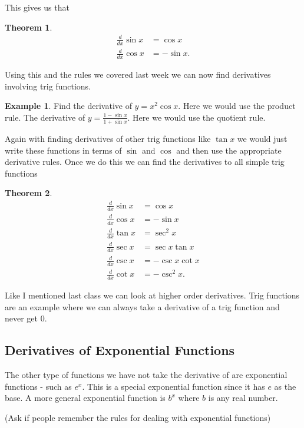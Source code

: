 \documentclass[12pt,reqno]{article}
\newtheorem{Theorem}{Theorem}
\theoremstyle{definition}
\newtheorem*{Example}{Example}
\begin{document}
This gives us that 
\begin{Theorem}
	\begin{align*}
		\frac{d}{dx} \sin x &= \cos x \\
		\frac{d}{dx} \cos x &= - \sin x.
	\end{align*}
\end{Theorem}

Using this and the rules we covered last week we can now find derivatives involving trig functions. 
\begin{Example}
	Find the derivative of $y = x^2 \cos x$. Here we would use the product rule. 
	The derivative of $y = \frac{1 - \sin x}{1 + \sin x}$. Here we would use the quotient rule. 
\end{Example}

Again with finding derivatives of other trig functions like $\tan x$ we would just write these functions in terms of $\sin$ and $\cos$ and then use the appropriate derivative rules. Once we do this we can find the derivatives to all simple trig functions
\begin{Theorem}
\begin{align*}
	\frac{d}{dx} \sin x &= \cos x \\
	\frac{d}{dx} \cos x &= - \sin x \\
	\frac{d}{dx} \tan x &= \sec^2 x \\
	\frac{d}{dx} \sec x &= \sec x \tan x \\ 
	\frac{d}{dx} \csc x &= - \csc x \cot x \\
	\frac{d}{dx} \cot x &= - \csc^2 x.
\end{align*}
\end{Theorem}

Like I mentioned last class we can look at higher order derivatives. Trig functions are an example where we can always take a derivative of a trig function and never get 0. 

\subsection{Derivatives of Exponential Functions}

The other type of functions we have not take the derivative of are exponential functions - such as $e^x$. This is a special exponential function since it has $e$ as the base. A more general exponential function is $b^x$ where $b$ is any real number. 

(Ask if people remember the rules for dealing with exponential functions)
\end{document}
